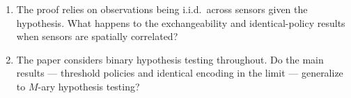 \documentclass[11pt]{article}
\begin{document}
\begin{enumerate}[leftmargin=*, itemsep=10pt]
    \item The proof relies on observations being i.i.d.\ across sensors
    given the hypothesis.
    What happens to the exchangeability and identical-policy results
    when sensors are spatially correlated?

    \item The paper considers binary hypothesis testing throughout.
    Do the main results --- threshold policies and identical encoding
    in the limit --- generalize to $M$-ary hypothesis testing?

\end{enumerate}
\end{document}
